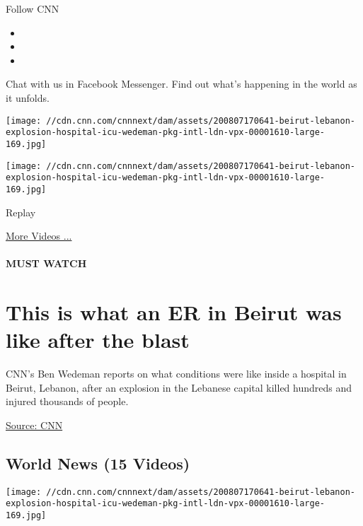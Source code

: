 Follow CNN

\begin{itemize}
\item
\item
\item
\end{itemize}

Chat with us in Facebook Messenger. Find out what's happening in the
world as it unfolds.

\texttt{[image: //cdn.cnn.com/cnnnext/dam/assets/200807170641-beirut-lebanon-explosion-hospital-icu-wedeman-pkg-intl-ldn-vpx-00001610-large-169.jpg]}

\texttt{[image: //cdn.cnn.com/cnnnext/dam/assets/200807170641-beirut-lebanon-explosion-hospital-icu-wedeman-pkg-intl-ldn-vpx-00001610-large-169.jpg]}\href{javascript:void(0);}{}

Replay

\href{/videos}{More Videos ...}

\hypertarget{must-watch}{%
\paragraph{MUST WATCH}\label{must-watch}}

\hypertarget{this-is-what-an-er-in-beirut-was-like-after-the-blast}{%
\section{This is what an ER in Beirut was like after the
blast}\label{this-is-what-an-er-in-beirut-was-like-after-the-blast}}

CNN's Ben Wedeman reports on what conditions were like inside a hospital
in Beirut, Lebanon, after an explosion in the Lebanese capital killed
hundreds and injured thousands of people.

\href{www.cnn.com}{Source: CNN}

\hypertarget{world-news-15-videos}{%
\subsection{World News (15 Videos)}\label{world-news-15-videos}}

\href{/videos/world/2020/08/07/beirut-lebanon-explosion-hospital-icu-wedeman-pkg-intl-ldn-vpx.cnn}{}

\texttt{[image: //cdn.cnn.com/cnnnext/dam/assets/200807170641-beirut-lebanon-explosion-hospital-icu-wedeman-pkg-intl-ldn-vpx-00001610-large-169.jpg]}

